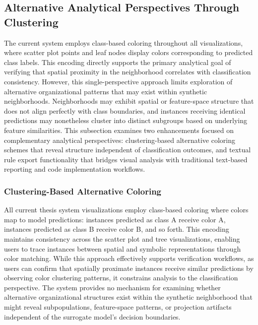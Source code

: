 \subsection{Alternative Analytical Perspectives Through Clustering}

The current system employs class-based coloring throughout all visualizations, where scatter plot points and leaf nodes display colors corresponding to predicted class labels. This encoding directly supports the primary analytical goal of verifying that spatial proximity in the neighborhood correlates with classification consistency. However, this single-perspective approach limits exploration of alternative organizational patterns that may exist within synthetic neighborhoods. Neighborhoods may exhibit spatial or feature-space structure that does not align perfectly with class boundaries, and instances receiving identical predictions may nonetheless cluster into distinct subgroups based on underlying feature similarities. This subsection examines two enhancements focused on complementary analytical perspectives: clustering-based alternative coloring schemes that reveal structure independent of classification outcomes, and textual rule export functionality that bridges visual analysis with traditional text-based reporting and code implementation workflows.

\subsubsection{Clustering-Based Alternative Coloring}

All current thesis system visualizations employ class-based coloring where colors map to model predictions: instances predicted as class A receive color A, instances predicted as class B receive color B, and so forth. This encoding maintains consistency across the scatter plot and tree visualizations, enabling users to trace instances between spatial and symbolic representations through color matching. While this approach effectively supports verification workflows, as users can confirm that spatially proximate instances receive similar predictions by observing color clustering patterns, it constrains analysis to the classification perspective. The system provides no mechanism for examining whether alternative organizational structures exist within the synthetic neighborhood that might reveal subpopulations, feature-space patterns, or projection artifacts independent of the surrogate model's decision boundaries.


